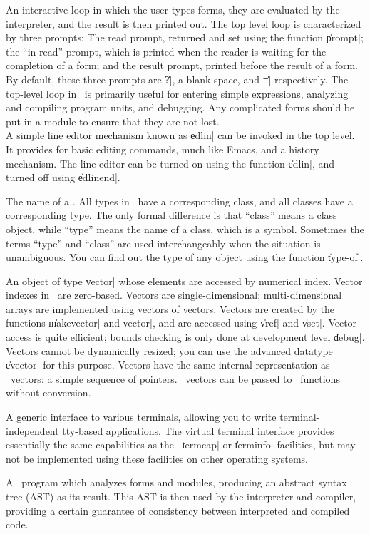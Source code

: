 \begin{description}
	{An interactive loop in which the user types forms, they are
	evaluated by the interpreter, and the result is then printed
	out.  The top level loop is characterized by three prompts:
	The read prompt, returned and set using the function
	\|prompt|; the ``in-read'' prompt, which is printed when the
	reader is waiting for the completion of a form; and the result
	prompt, printed before the result of a form.  By default,
	these three prompts are \|?|, a blank space, and \|=|
	respectively.  The top-level loop in \Talk\ is primarily
	useful for entering simple expressions, analyzing and
	compiling program units, and debugging.  Any complicated forms
	should be put in a module to ensure that they are not lost. \\
	A simple line editor mechanism known as \|edlin| can be
	invoked in the top level.  It provides for basic editing
	commands, much like Emacs, and a history mechanism.  The line
	editor can be turned on using the function \|edlin|, and
	turned off using \|edlinend|.}

	{The name of a .  All types in \Talk\ have a
	corresponding class, and all classes have a corresponding
	type.  The only formal difference is that ``class'' means a
	class object, while ``type'' means the name of a class, which
	is a symbol.  Sometimes the terms ``type'' and ``class'' are
	used interchangeably when the situation is unambiguous.  You
	can find out the type of any object using the function
	\|type-of|.}

	{An object of type \|vector| whose elements are accessed by
	numerical index.  Vector indexes in \Talk\ are zero-based.
	Vectors are single-dimensional; multi-dimensional arrays are
	implemented using vectors of vectors.  Vectors are created by
	the functions \|makevector| and \|vector|, and are accessed
	using \|vref| and \|vset|.  Vector access is quite efficient;
	bounds checking is only done at development level \|debug|.
	Vectors cannot be dynamically resized; you can use the
	advanced datatype \|evector| for this purpose.  Vectors have
	the same internal representation as \langc\ vectors:  a simple
	sequence of pointers.  \Talk\ vectors can be passed to \langc\
	functions without conversion.}

	{A generic interface to various terminals, allowing you to
	write terminal-independent tty-based applications.  The
	virtual terminal interface provides essentially the same
	capabilities as the \Unix\ \|termcap| or \|terminfo|
	facilities, but may not be implemented using these facilities
	on other operating systems.}

	{A \Talk\ program which analyzes forms and modules, producing
	an abstract syntax tree (AST) as its result.  This AST is then
	used by the interpreter and compiler, providing a certain
	guarantee of consistency between interpreted and compiled
	code.}

\end{description}

\End
